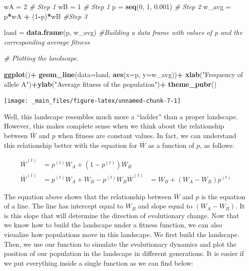 \documentclass[
]{book}
\newenvironment{Shaded}{\begin{snugshade}}{\end{snugshade}}
\newcommand{\AttributeTok}[1]{\textcolor[rgb]{0.13,0.29,0.53}{#1}}
\newcommand{\CommentTok}[1]{\textcolor[rgb]{0.56,0.35,0.01}{\textit{#1}}}
\newcommand{\DecValTok}[1]{\textcolor[rgb]{0.00,0.00,0.81}{#1}}
\newcommand{\FloatTok}[1]{\textcolor[rgb]{0.00,0.00,0.81}{#1}}
\newcommand{\FunctionTok}[1]{\textcolor[rgb]{0.13,0.29,0.53}{\textbf{#1}}}
\newcommand{\NormalTok}[1]{#1}
\newcommand{\OtherTok}[1]{\textcolor[rgb]{0.56,0.35,0.01}{#1}}
\newcommand{\SpecialCharTok}[1]{\textcolor[rgb]{0.81,0.36,0.00}{\textbf{#1}}}
\newcommand{\StringTok}[1]{\textcolor[rgb]{0.31,0.60,0.02}{#1}}
\begin{document}
\begin{Shaded}
\begin{Highlighting}[]
\NormalTok{wA }\OtherTok{=} \DecValTok{2} \CommentTok{\# Step 1}
\NormalTok{wB }\OtherTok{=} \DecValTok{1} \CommentTok{\# Step 1}
\NormalTok{p }\OtherTok{=} \FunctionTok{seq}\NormalTok{(}\DecValTok{0}\NormalTok{, }\DecValTok{1}\NormalTok{, }\FloatTok{0.001}\NormalTok{) }\CommentTok{\# Step 2}
\NormalTok{w\_avg }\OtherTok{=}\NormalTok{ p}\SpecialCharTok{*}\NormalTok{wA }\SpecialCharTok{+}\NormalTok{ (}\DecValTok{1}\SpecialCharTok{{-}}\NormalTok{p)}\SpecialCharTok{*}\NormalTok{wB }\CommentTok{\#Step 3}

\NormalTok{land }\OtherTok{=} \FunctionTok{data.frame}\NormalTok{(p, w\_avg) }\CommentTok{\#Building a data frame with values of p and the corresponding average fitness}

\CommentTok{\# Plotting the landscape.}

\FunctionTok{ggplot}\NormalTok{()}\SpecialCharTok{+}
  \FunctionTok{geom\_line}\NormalTok{(}\AttributeTok{data=}\NormalTok{land, }\FunctionTok{aes}\NormalTok{(}\AttributeTok{x=}\NormalTok{p, }\AttributeTok{y=}\NormalTok{w\_avg))}\SpecialCharTok{+}
  \FunctionTok{xlab}\NormalTok{(}\StringTok{"Frequency of allele A"}\NormalTok{)}\SpecialCharTok{+}\FunctionTok{ylab}\NormalTok{(}\StringTok{"Average fitness of the population"}\NormalTok{)}\SpecialCharTok{+}
  \FunctionTok{theme\_pubr}\NormalTok{()}
\end{Highlighting}
\end{Shaded}

\texttt{[image: \_main\_files/figure-latex/unnamed-chunk-7-1]}

Well, this landscape resembles much more a ``ladder'' than a proper landscape. However, this makes complete sense when we think about the relationship between \(\overline{W}\) and \(p\) when fitness are constant values. In fact, we can understand this relationship better with the equation for \(\overline{W}\) as a function of \(p\), as follows:

\[\begin{aligned}
\overline{W}^{(t)}&=p^{(t)}W_{A} + (1-p^{(t)})W_{B} \\
\overline{W}^{(t)}&=p^{(t)}W_{A} + W_{B} - p^{(t)}W_{B}
\overline{W}^{(t)}&=W_{B}+(W_{A}-W_{B})p^{(t)}
\end{aligned}\]

The equation above shows that the relationship between \(\overline{W}\) and \(p\) is the equation of a line. The line has intercept equal to \(W_{B}\) and slope equal to \((W_{A}-W_{B})\). It is this slope that will determine the direction of evolutionary change. Now that we know how to build the landscape under a fitness function, we can also visualize how populations move in this landscape. We first build the landscape. Then, we use our function to simulate the evolutionary dynamics and plot the position of our population in the landscape in different generations. It is easier if we put everything inside a single function as we can find below:
\end{document}
